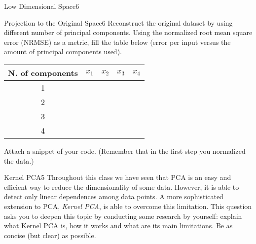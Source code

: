 \begin{questions}
\begin{question}{Low Dimensional Space}{6}
\begin{answer}\end{answer}

\end{question}


\begin{question}{Projection to the Original Space}{6}
Reconstruct the original dataset by using different number of principal components. Using the normalized root mean square error (NRMSE) as a metric, fill the table below (error per input versus the amount of principal components used).

\begin{tabular}{c|r|r|r|r}
N. of components & $x_1$ & $x_2$ & $x_3$ & $x_4$ \\
\hline
1 & & & & \\
2 & & & & \\
3 & & & & \\
4 & & & &
\end{tabular}

Attach a snippet of your code.
(Remember that in the first step you normalized the data.)

\begin{answer}\end{answer}
\end{question}

\begin{question}[bonus]{Kernel PCA}{5}
Throughout this class we have seen that PCA is an easy and efficient way to reduce the dimensionality of some data. However, it is able to detect only linear dependences among data points. A more sophisticated extension to PCA, \emph{Kernel PCA}, is able to overcome this limitation. 
This question asks you to deepen this topic by conducting some research by yourself: explain what Kernel PCA is, how it works and what are its main limitations. Be as concise (but clear) as possible.

\begin{answer}\end{answer}
\end{question}

\end{questions}
